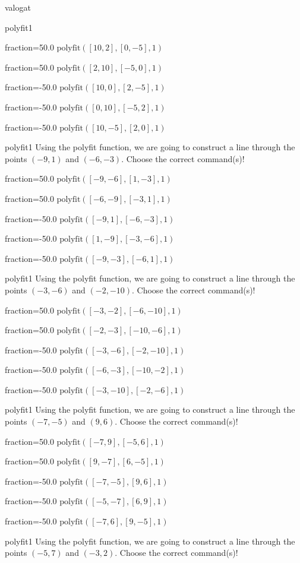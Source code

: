 \documentclass[12pt]{article}
\begin{document}
\begin{quiz}{valogat}
\begin{multi}[multiple]{polyfit1}
\item[fraction=50.0] $\mathrm{polyfit}([10,2], [0,-5], 1)$
\item[fraction=50.0] $\mathrm{polyfit}([2,10], [-5,0], 1)$
\item[fraction=-50.0]  $\mathrm{polyfit}([10,0], [2,-5], 1)$
\item[fraction=-50.0]  $\mathrm{polyfit}([0,10], [-5,2], 1)$
\item[fraction=-50.0]  $\mathrm{polyfit}([10,-5], [2,0], 1)$
\end{multi}
\begin{multi}[multiple]{polyfit1}
Using the polyfit function, we are going to construct a line through the points $\left(-9,1\right)$ and $\left(-6,-3\right)$.
Choose the correct command(s)!

\item[fraction=50.0] $\mathrm{polyfit}([-9,-6], [1,-3], 1)$
\item[fraction=50.0] $\mathrm{polyfit}([-6,-9], [-3,1], 1)$
\item[fraction=-50.0]  $\mathrm{polyfit}([-9,1], [-6,-3], 1)$
\item[fraction=-50.0]  $\mathrm{polyfit}([1,-9], [-3,-6], 1)$
\item[fraction=-50.0]  $\mathrm{polyfit}([-9,-3], [-6,1], 1)$
\end{multi}
\begin{multi}[multiple]{polyfit1}
Using the polyfit function, we are going to construct a line through the points $\left(-3,-6\right)$ and $\left(-2,-10\right)$.
Choose the correct command(s)!

\item[fraction=50.0] $\mathrm{polyfit}([-3,-2], [-6,-10], 1)$
\item[fraction=50.0] $\mathrm{polyfit}([-2,-3], [-10,-6], 1)$
\item[fraction=-50.0]  $\mathrm{polyfit}([-3,-6], [-2,-10], 1)$
\item[fraction=-50.0]  $\mathrm{polyfit}([-6,-3], [-10,-2], 1)$
\item[fraction=-50.0]  $\mathrm{polyfit}([-3,-10], [-2,-6], 1)$
\end{multi}
\begin{multi}[multiple]{polyfit1}
Using the polyfit function, we are going to construct a line through the points $\left(-7,-5\right)$ and $\left(9,6\right)$.
Choose the correct command(s)!

\item[fraction=50.0] $\mathrm{polyfit}([-7,9], [-5,6], 1)$
\item[fraction=50.0] $\mathrm{polyfit}([9,-7], [6,-5], 1)$
\item[fraction=-50.0]  $\mathrm{polyfit}([-7,-5], [9,6], 1)$
\item[fraction=-50.0]  $\mathrm{polyfit}([-5,-7], [6,9], 1)$
\item[fraction=-50.0]  $\mathrm{polyfit}([-7,6], [9,-5], 1)$
\end{multi}
\begin{multi}[multiple]{polyfit1}
Using the polyfit function, we are going to construct a line through the points $\left(-5,7\right)$ and $\left(-3,2\right)$.
Choose the correct command(s)!


\end{multi}
\end{quiz}
\end{document}
